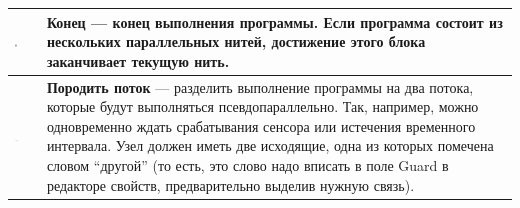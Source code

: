 \documentclass[a4paper,12pt,twoside]{article}
\begin{document}
\begin{center}
\begin{tabular}{m{} | m{}}
    {\vspace{10pt}\includegraphics[width=0.10\textwidth]{End.png}}           & \textbf{Конец} --- конец выполнения программы. Если программа состоит из нескольких параллельных нитей, достижение этого блока заканчивает текущую нить. \\ \hline
    {\vspace{10pt}\includegraphics[width=0.15\textwidth]{Fork.png}}          & \textbf{Породить поток} --- разделить выполнение программы на два потока, которые будут выполняться псевдопараллельно. Так, например, можно одновременно ждать срабатывания сенсора или истечения временного интервала. Узел должен иметь две исходящие, одна из которых помечена словом "`другой"' (то есть, это слово надо вписать в поле Guard в редакторе свойств, предварительно выделив нужную связь). \\ \hline
	\end{tabular}
\end{center}
    
\end{document}
